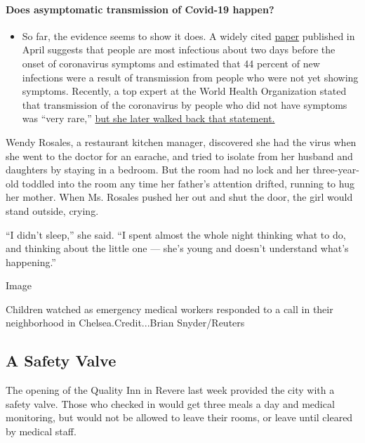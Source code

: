 \begin{itemize}
{  \paragraph{Does asymptomatic transmission of Covid-19
  happen?}\label{does-asymptomatic-transmission-of-covid-19-happen}}

  \begin{itemize}
  \tightlist
  \item
    So far, the evidence seems to show it does. A widely cited
    \href{https://www.nature.com/articles/s41591-020-0869-5}{paper}
    published in April suggests that people are most infectious about
    two days before the onset of coronavirus symptoms and estimated that
    44 percent of new infections were a result of transmission from
    people who were not yet showing symptoms. Recently, a top expert at
    the World Health Organization stated that transmission of the
    coronavirus by people who did not have symptoms was ``very rare,''
    \href{https://www.nytimes.com/2020/06/09/world/coronavirus-updates.html?action=click\&pgtype=Article\&state=default\&region=MAIN_CONTENT_3\&context=storylines_faq\#link-1f302e21}{but
    she later walked back that statement.}
  \end{itemize}
\end{itemize}

Wendy Rosales, a restaurant kitchen manager, discovered she had the
virus when she went to the doctor for an earache, and tried to isolate
from her husband and daughters by staying in a bedroom. But the room had
no lock and her three-year-old toddled into the room any time her
father's attention drifted, running to hug her mother. When Ms. Rosales
pushed her out and shut the door, the girl would stand outside, crying.

``I didn't sleep,'' she said. ``I spent almost the whole night thinking
what to do, and thinking about the little one --- she's young and
doesn't understand what's happening.''

Image

Children watched as emergency medical workers responded to a call in
their neighborhood in Chelsea.Credit...Brian Snyder/Reuters

\hypertarget{a-safety-valve}{%
\subsection{A Safety Valve}\label{a-safety-valve}}

The opening of the Quality Inn in Revere last week provided the city
with a safety valve. Those who checked in would get three meals a day
and medical monitoring, but would not be allowed to leave their rooms,
or leave until cleared by medical staff.

